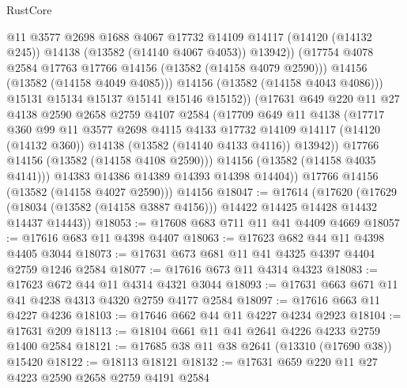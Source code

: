 \begin{lexlean}{RustCore}
\begin{coremodule}
                        @11
                        @3577
                        @2698
                        @1688
                        @4067
                        @17732
                        @14109
                        @14117
                        (@14120 (@14132 @245))
                        @14138
                        (@13582 (@14140 @4067 @4053))
                        @13942))
                    (@17754 @4078 @2584 @17763 @17766 @14156 (@13582 (@14158 @4079 @2590)))
                    @14156
                    (@13582 (@14158 @4049 @4085)))
                  @14156
                  (@13582 (@14158 @4043 @4086)))
                @15131
                @15134
                @15137
                @15141
                @15146
                @15152))
            (@17631
              @649
              @220
              @11
              @27
              @4138
              @2590
              @2658
              @2759
              @4107
              @2584
              (@17709
                @649
                @11
                @4138
                (@17717
                  @360
                  @99
                  @11
                  @3577
                  @2698
                  @4115
                  @4133
                  @17732
                  @14109
                  @14117
                  (@14120 (@14132 @360))
                  @14138
                  (@13582 (@14140 @4133 @4116))
                  @13942))
              @17766
              @14156
              (@13582 (@14158 @4108 @2590)))
            @14156
            (@13582 (@14158 @4035 @4141)))
          @14383
          @14386
          @14389
          @14393
          @14398
          @14404))
      @17766
      @14156
      (@13582 (@14158 @4027 @2590)))
    @14156
@18047 := @17614
    (@17620
      (@17629 (@18034 (@13582 (@14158 @3887 @4156))) @14422 @14425 @14428 @14432 @14437 @14443))
@18053 := @17608 @683 @711 @11 @41 @4409 @4669
@18057 := @17616 @683 @11 @4398 @4407
@18063 := @17623 @682 @44 @11 @4398 @4405 @3044
@18073 := @17631 @673 @681 @11 @41 @4325 @4397 @4404 @2759 @1246 @2584
@18077 := @17616 @673 @11 @4314 @4323
@18083 := @17623 @672 @44 @11 @4314 @4321 @3044
@18093 := @17631 @663 @671 @11 @41 @4238 @4313 @4320 @2759 @4177 @2584
@18097 := @17616 @663 @11 @4227 @4236
@18103 := @17646 @662 @44 @11 @4227 @4234 @2923
@18104 := @17631 @209
@18113 := @18104 @661 @11 @41 @2641 @4226 @4233 @2759 @1400 @2584
@18121 := @17685 @38 @11 @38 @2641 (@13310 (@17690 @38)) @15420
@18122 := @18113 @18121
@18132 := @17631 @659 @220 @11 @27 @4223 @2590 @2658 @2759 @4191 @2584

\end{coremodule}
\end{lexlean}
